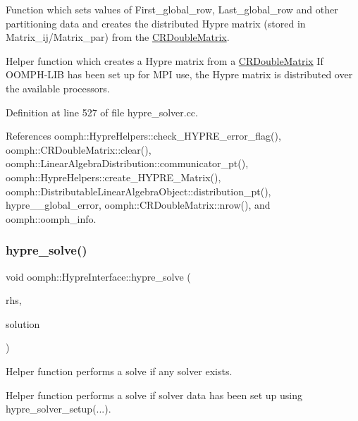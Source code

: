 Function which sets values of First\+\_\+global\+\_\+row, Last\+\_\+global\+\_\+row and other partitioning data and creates the distributed Hypre matrix (stored in Matrix\+\_\+ij/\+Matrix\+\_\+par) from the \hyperlink{classoomph_1_1CRDoubleMatrix}{C\+R\+Double\+Matrix}. 

Helper function which creates a Hypre matrix from a \hyperlink{classoomph_1_1CRDoubleMatrix}{C\+R\+Double\+Matrix} If O\+O\+M\+P\+H-\/\+L\+IB has been set up for M\+PI use, the Hypre matrix is distributed over the available processors. 

Definition at line 527 of file hypre\+\_\+solver.\+cc.



References oomph\+::\+Hypre\+Helpers\+::check\+\_\+\+H\+Y\+P\+R\+E\+\_\+error\+\_\+flag(), oomph\+::\+C\+R\+Double\+Matrix\+::clear(), oomph\+::\+Linear\+Algebra\+Distribution\+::communicator\+\_\+pt(), oomph\+::\+Hypre\+Helpers\+::create\+\_\+\+H\+Y\+P\+R\+E\+\_\+\+Matrix(), oomph\+::\+Distributable\+Linear\+Algebra\+Object\+::distribution\+\_\+pt(), hypre\+\_\+\+\_\+global\+\_\+error, oomph\+::\+C\+R\+Double\+Matrix\+::nrow(), and oomph\+::oomph\+\_\+info.

\mbox{\label{classoomph_1_1HypreInterface_a5cdd3f8621333e94d8a1004611bc6793}} 
\subsubsection{\texorpdfstring{hypre\+\_\+solve()}{hypre\_solve()}}
{\footnotesize\ttfamily void oomph\+::\+Hypre\+Interface\+::hypre\+\_\+solve (\begin{DoxyParamCaption}\item[{const \hyperlink{classoomph_1_1DoubleVector}{Double\+Vector} \&}]{rhs,  }\item[{\hyperlink{classoomph_1_1DoubleVector}{Double\+Vector} \&}]{solution }\end{DoxyParamCaption})\hspace{0.3cm}{\ttfamily [protected]}}



Helper function performs a solve if any solver exists. 

Helper function performs a solve if solver data has been set up using hypre\+\_\+solver\+\_\+setup(...). 

